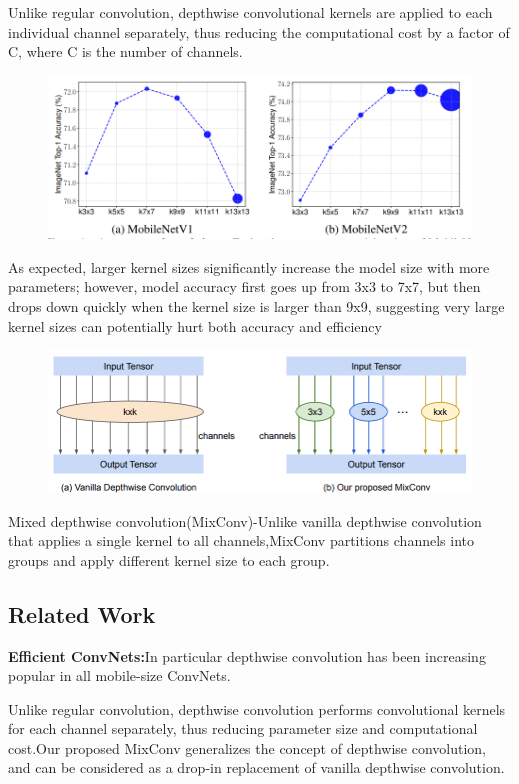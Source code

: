 \documentclass[11pt]{article}
\begin{document}
Unlike regular convolution, depthwise convolutional kernels are applied to each individual channel separately, thus reducing the computational cost by a factor of C, where C is the number of channels.
\begin{figure}[H]
	\centering
	\includegraphics[scale = 0.55]{54}
\end{figure}
As expected, larger kernel sizes significantly increase the model size with more parameters; however, model accuracy first goes up from 3x3 to 7x7, but then drops down quickly when the kernel size is larger than 9x9, suggesting very large kernel sizes can potentially hurt both accuracy and efficiency

\begin{figure}[H]
	\centering
	\includegraphics[scale = 0.55]{55}
\end{figure}
Mixed depthwise convolution(MixConv)-Unlike vanilla depthwise convolution that applies a single kernel to all channels,MixConv partitions channels into groups and apply different kernel size to each group.
\subsection{Related Work}
\textbf{Efficient ConvNets:}In particular depthwise convolution has been increasing popular in all mobile-size ConvNets.

Unlike regular convolution, depthwise convolution performs convolutional kernels for each channel separately, thus reducing parameter size and computational cost.Our proposed MixConv generalizes the concept of depthwise convolution, and can be considered as a drop-in replacement of vanilla depthwise convolution.
\end{document}
